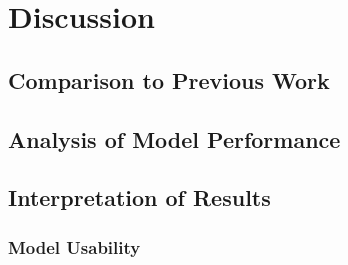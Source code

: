 \section{Discussion}

\subsection{Comparison to Previous Work}

\subsection{Analysis of Model Performance}


\subsection{Interpretation of Results}




\subsubsection{Model Usability}





